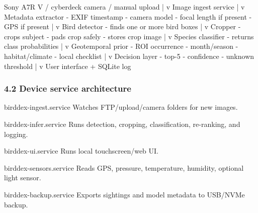 \documentclass[
  11pt,
]{article}
\newenvironment{Shaded}{}{}
\newcommand{\NormalTok}[1]{#1}
\begin{document}
\begin{Shaded}
\begin{Highlighting}[]
\NormalTok{Sony A7R V / cyberdeck camera / manual upload}
\NormalTok{        |}
\NormalTok{        v}
\NormalTok{Image ingest service}
\NormalTok{        |}
\NormalTok{        v}
\NormalTok{Metadata extractor}
\NormalTok{  {-} EXIF timestamp}
\NormalTok{  {-} camera model}
\NormalTok{  {-} focal length if present}
\NormalTok{  {-} GPS if present}
\NormalTok{        |}
\NormalTok{        v}
\NormalTok{Bird detector}
\NormalTok{  {-} finds one or more bird boxes}
\NormalTok{        |}
\NormalTok{        v}
\NormalTok{Cropper}
\NormalTok{  {-} crops subject}
\NormalTok{  {-} pads crop safely}
\NormalTok{  {-} stores crop image}
\NormalTok{        |}
\NormalTok{        v}
\NormalTok{Species classifier}
\NormalTok{  {-} returns class probabilities}
\NormalTok{        |}
\NormalTok{        v}
\NormalTok{Geotemporal prior}
\NormalTok{  {-} ROI occurrence}
\NormalTok{  {-} month/season}
\NormalTok{  {-} habitat/climate}
\NormalTok{  {-} local checklist}
\NormalTok{        |}
\NormalTok{        v}
\NormalTok{Decision layer}
\NormalTok{  {-} top{-}5}
\NormalTok{  {-} confidence}
\NormalTok{  {-} unknown threshold}
\NormalTok{        |}
\NormalTok{        v}
\NormalTok{User interface + SQLite log}
\end{Highlighting}
\end{Shaded}

\subsubsection{4.2 Device service
architecture}\label{device-service-architecture}

\begin{Shaded}
\begin{Highlighting}[]
\NormalTok{birddex{-}ingest.service}
\NormalTok{  Watches FTP/upload/camera folders for new images.}

\NormalTok{birddex{-}infer.service}
\NormalTok{  Runs detection, cropping, classification, re{-}ranking, and logging.}

\NormalTok{birddex{-}ui.service}
\NormalTok{  Runs local touchscreen/web UI.}

\NormalTok{birddex{-}sensors.service}
\NormalTok{  Reads GPS, pressure, temperature, humidity, optional light sensor.}

\NormalTok{birddex{-}backup.service}
\NormalTok{  Exports sightings and model metadata to USB/NVMe backup.}
\end{Highlighting}
\end{Shaded}
\end{document}
